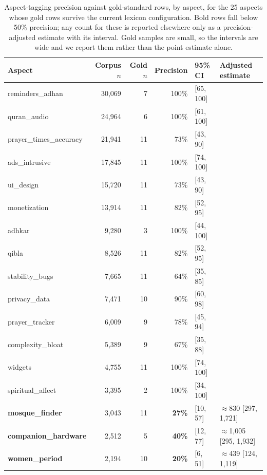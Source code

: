 \begin{table}[t]
  \centering
  \small
  \caption{Aspect-tagging precision against gold-standard rows, by aspect, for the 25 aspects whose gold rows survive the current lexicon configuration. Bold rows fall below 50\% precision; any count for these is reported elsewhere only as a precision-adjusted estimate with its interval. Gold samples are small, so the intervals are wide and we report them rather than the point estimate alone.}
  \label{tab:aspect-precision}
  \begin{tabular}{lrrrll}
    \toprule
    Aspect & Corpus \(n\) & Gold \(n\) & Precision & 95\% CI & Adjusted estimate \\
    \midrule
    reminders\_adhan        & 30{,}069 & 7  & 100\% & [65, 100] & \\
    quran\_audio            & 24{,}964 & 6  & 100\% & [61, 100] & \\
    prayer\_times\_accuracy & 21{,}941 & 11 & 73\%  & [43, 90]  & \\
    ads\_intrusive          & 17{,}845 & 11 & 100\% & [74, 100] & \\
    ui\_design              & 15{,}720 & 11 & 73\%  & [43, 90]  & \\
    monetization            & 13{,}914 & 11 & 82\%  & [52, 95]  & \\
    adhkar                  & 9{,}280  & 3  & 100\% & [44, 100] & \\
    qibla                   & 8{,}526  & 11 & 82\%  & [52, 95]  & \\
    stability\_bugs         & 7{,}665  & 11 & 64\%  & [35, 85]  & \\
    privacy\_data           & 7{,}471  & 10 & 90\%  & [60, 98]  & \\
    prayer\_tracker         & 6{,}009  & 9  & 78\%  & [45, 94]  & \\
    complexity\_bloat       & 5{,}389  & 9  & 67\%  & [35, 88]  & \\
    widgets                 & 4{,}755  & 11 & 100\% & [74, 100] & \\
    spiritual\_affect       & 3{,}395  & 2  & 100\% & [34, 100] & \\
    \textbf{mosque\_finder}      & 3{,}043 & 11 & \textbf{27\%} & [10, 57] & \(\approx\)830 [297, 1{,}721] \\
    \textbf{companion\_hardware} & 2{,}512 & 5  & \textbf{40\%} & [12, 77] & \(\approx\)1{,}005 [295, 1{,}932] \\
    \textbf{women\_period}       & 2{,}194 & 10 & \textbf{20\%} & [6, 51]  & \(\approx\)439 [124, 1{,}119] \\

\end{tabular}
\end{table}
